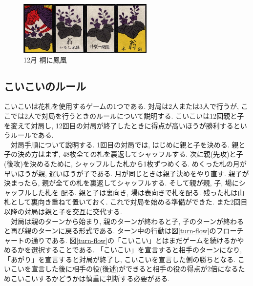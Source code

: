 \documentclass[a4j]{jarticle}
\begin{document}
      \begin{figure}[H]
      \centering
      \includegraphics[scale=1.5]{./img/dec.eps}
      \caption{12月 桐に鳳凰}
      \label{dec}
      \end{figure}

    \subsection{こいこいのルール}
      こいこいは花札を使用するゲームの1つである. 対局は2人または3人で行うが, ここでは2人で対局を行うときのルールについて説明する.
      こいこいは12回親と子を変えて対局し, 12回目の対局が終了したときに得点が高いほうが勝利するというルールである. \\
      　対局手順について説明する. 1回目の対局では, はじめに親と子を決める. 親と子の決め方はまず, 48枚全ての札を裏返してシャッフルする. 次に親(先攻)と子(後攻)を決めるために, シャッフルした札から1枚ずつめくる. 
      めくった札の月が早いほうが親, 遅いほうが子である. 月が同じときは親子決めをやり直す. 親子が決まったら, 親が全ての札を裏返してシャッフルする. そして親が親, 子, 場にシャッフルした札を
      配る. 親と子は裏向き, 場は表向きで札を配る. 残った札は山札として裏向き重ねて置いておく. これで対局を始める準備ができた. また2回目以降の対局は親と子を交互に交代する. \\
      　対局は親のターンから始まり, 親のターンが終わると子, 子のターンが終わると再び親のターンに戻る形式である. ターン中の行動は図\ref{turn-flow}のフローチャートの通りである.
      図\ref{turn-flow}の「こいこい」とはまだゲームを続けるかやめるかを選択することである. 「こいこい」を宣言すると相手のターンになり, 「あがり」を宣言すると対局が終了し, 
      こいこいを宣言した側の勝ちとなる. こいこいを宣言した後に相手の役(後述)ができると相手の役の得点が2倍になるためこいこいするかどうかは慎重に判断する必要がある.
\end{document}
